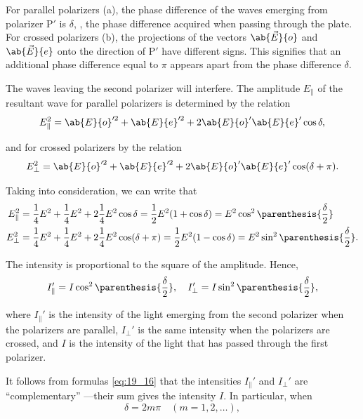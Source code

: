 For parallel polarizers (a), the phase difference of the waves emerging from polarizer P$'$ is $\delta$, \ie, the phase difference acquired when passing through the plate.
For crossed polarizers (b), the projections of the vectors $\ab{\vec{E}}{o}$ and $\ab{\vec{E}}{e}$ onto the direction of P$'$ have different signs.
This signifies that an additional phase difference equal to $\pi$ appears apart from the phase difference $\delta$.

The waves leaving the second polarizer will interfere.
The amplitude $E_{\parallel}$ of the resultant wave for parallel polarizers is determined by the relation
\begin{equation*}
	E_{\parallel}^2 = \ab{E}{o}'^2 + \ab{E}{e}'^2 + 2 \ab{E}{o}' \ab{E}{e}' \cos\delta,
\end{equation*}

\noindent
and for crossed polarizers by the relation
\begin{equation*}
	E_{\perp}^2 = \ab{E}{o}'^2 + \ab{E}{e}'^2 + 2 \ab{E}{o}' \ab{E}{e}' \cos(\delta + \pi).
\end{equation*}

Taking  into consideration, we can write that
\begin{align*}
	E_{\parallel}^2 &= \frac{1}{4} E^2 + \frac{1}{4} E^2 + 2 \frac{1}{4} E^2 \cos\delta = \frac{1}{2} E^2 (1 + \cos\delta) = E^2 \cos^2\parenthesis{\frac{\delta}{2}}\\
	 E_{\perp}^2 &= \frac{1}{4} E^2 + \frac{1}{4} E^2 + 2 \frac{1}{4} E^2 \cos(\delta+\pi) = \frac{1}{2} E^2 (1 - \cos\delta) = E^2 \sin^2\parenthesis{\frac{\delta}{2}}.
\end{align*}

The intensity is proportional to the square of the amplitude.
Hence,
\begin{equation}\label{eq:19_16}
	I_{\parallel}' = I \cos^2\parenthesis{\frac{\delta}{2}},\quad I_{\perp}' = I \sin^2\parenthesis{\frac{\delta}{2}},
\end{equation}

\noindent
where $I_{\parallel}'$ is the intensity of the light emerging from the second polarizer when the polarizers are parallel, $I_{\perp}'$ is the same intensity when the polarizers are crossed, and $I$ is the intensity of the light that has passed through the first polarizer.

It follows from formulas \eqref{eq:19_16} that the intensities $I_{\parallel}'$ and $I_{\perp}'$ are ``complementary'' ---their sum gives the intensity $I$.
In particular, when
\begin{equation}\label{eq:19_17}
	\delta = 2 m \pi \quad (m=1,2,\ldots),
\end{equation}

